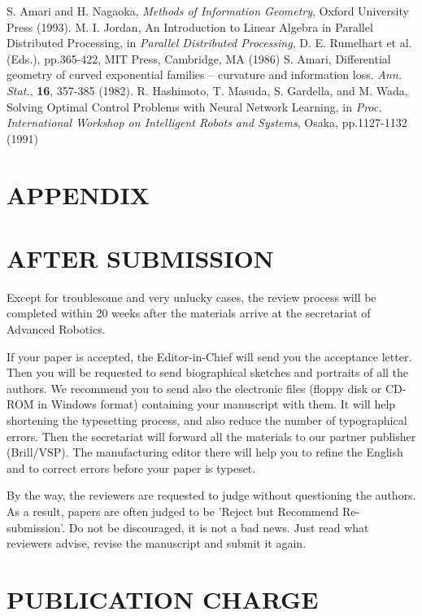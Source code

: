 \documentclass{arsubmit}
\begin{document}
\begin{thebibliography}{99}
S. Amari and H. Nagaoka, {\em Methods of Information Geometry},
Oxford University Press (1993).
M. I. Jordan, An Introduction to Linear Algebra in Parallel 
Distributed Processing, in {\em Parallel Distributed Processing}, 
 D. E. Rumelhart et al. (Eds.), pp.365-422, MIT Press, Cambridge, MA (1986)
S. Amari, Differential geometry of curved exponential families 
-- curvature and information loss. {\em Ann. Stat.}, 
{\bf 16}, 357-385 (1982).
 R. Hashimoto, T. Masuda, S. Gardella, and M. Wada, 
Solving Optimal Control Problems with Neural Network Learning, in {\em Proc. 
International Workshop on Intelligent Robots and Systems}, Osaka, pp.1127-1132 
(1991)
\end{thebibliography}
\appendix
\section*{APPENDIX}  %

\section{AFTER SUBMISSION}
\label{sec:After Submission}

Except for troublesome and very unlucky cases, the review process will be
completed within 20 weeks after the materials arrive at the
secretariat of Advanced Robotics.

If your paper is accepted, the Editor-in-Chief will send you the
acceptance letter.  Then you will be requested to send
biographical sketches and portraits of all the authors.  
We recommend you to
send also the electronic files (floppy disk or CD-ROM in Windows format)
containing your manuscript with them.  It will help shortening the 
typesetting process, and also reduce the number of typographical errors.
Then the secretariat
will forward all the materials to our partner publisher (Brill/VSP).
The manufacturing editor there will help you to refine the English
and to correct errors before your paper is typeset.

By the way, the reviewers are requested to judge without questioning
the authors.  As a result, papers are often judged to be 'Reject but 
Recommend Re-submission'.  Do not be discouraged, it is not a bad news.
Just read what
reviewers advise, revise the manuscript and submit it again.


\section{PUBLICATION CHARGE}
\label{sec:publication charge}
\end{document}
